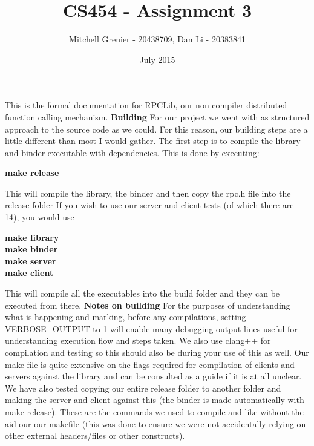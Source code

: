 \documentclass[]{article}
\begin{document}
\title{CS454 - Assignment 3}
\author{Mitchell Grenier - 20438709, Dan Li - 20383841}

\date{July 2015}
\maketitle

This is the formal documentation for RPCLib, our non compiler distributed function calling mechanism.
\newline\newline
\noindent
{\bf Building}\newline
For our project we went with as structured approach to the source code as we could. For this reason, our building steps are a little different than most I would gather. The first step is to compile the library and binder executable with dependencies. This is done by executing:
\begin{center}
{\bf make release}
\end{center}
This will compile the library, the binder and then copy the rpc.h file into the release folder If you wish to use our server and client tests (of which there are 14), you would use
\begin{center}
{\bf make library}\\
{\bf make binder}\\
{\bf make server}\\
{\bf make client}\\
\end{center}
This will compile all the executables into the build folder and they can be executed from there.
\noindent
\newline\newline
{\bf Notes on building}\newline
For the purposes of understanding what is happening and marking, before any compilations, setting VERBOSE\_OUTPUT to 1 will enable many debugging output lines useful for understanding execution flow and steps taken.\newline\newline
We also use clang++ for compilation and testing so this should also be during your use of this as well. Our make file is quite extensive on the flags required for compilation of clients and servers against the library and can be consulted as a guide if it is at all unclear. We have also tested copying our entire release folder to another folder and making the server and client against this (the binder is made automatically with make release). These are the commands we used to compile and like without the aid our our makefile (this was done to ensure we were not accidentally relying on other external headers/files or other constructs).
\end{document}
